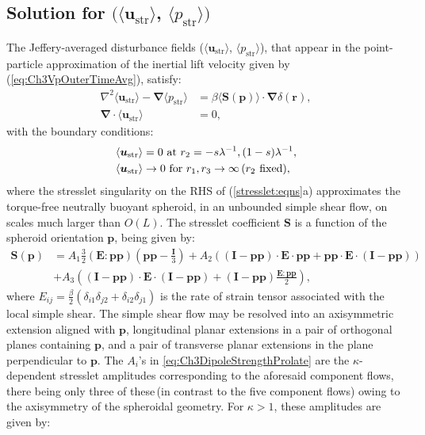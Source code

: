 \documentclass{jfm}
\begin{document}
\subsection{\texorpdfstring{Solution for $(\langle\bm{u}_\text{str}\rangle$, $\langle p_\text{str}\rangle)$}{Solution for the velocity field due to bounded Stresslet}}\label{sec:Ch3boundedstresslet}

The Jeffery-averaged disturbance fields ($\langle\bm{u}_\text{str}\rangle$, $\langle p_\text{str}\rangle$), that appear in the point-particle approximation of the inertial lift velocity given by (\ref{eq:Ch3VpOuterTimeAvg}), satisfy:
    \begin{subequations} \label{eq:Ch3StressletEqn}
    	\begin{align}
    	\nabla^2 \langle\bm{u}_\text{str}\rangle-\bm{\nabla}\langle p_\text{str}\rangle&=\beta\langle\bm{S}(\bm{p})\rangle\cdot \bm{\nabla}\delta(\bm{r}),\\
    	\bm{\nabla}\cdot\langle\bm{u}_\text{str}\rangle&=0,
    	\end{align}  \label{stresslet:eqns}
    \end{subequations}
    with the boundary conditions: 
    \begin{subequations} \label{eq:Ch3StressletBC}
    	\begin{align}
    	\langle\bm{u}_\text{str}\rangle&=0 \text{ at } r_2=-s\lambda^{-1}, (1-s)\lambda^{-1},\\    	\langle\bm{u}_\text{str}\rangle&\rightarrow 0 \text{ for } r_1,r_3\rightarrow\infty\,(r_2\hspace*{0.05in}\text{fixed}),
    	\end{align}
    \end{subequations}
where the stresslet singularity on the RHS of (\ref{stresslet:eqns}a) approximates the torque-free neutrally buoyant spheroid, in an unbounded simple shear flow, on scales much larger than $O(L)$. The stresslet coefficient $\bm{S}$ is a function of the spheroid orientation $\bm{p}$, being given by\citep{navaneeth2017}:
\begin{align}
\bm{S}(\bm{p})&= A_1 \frac{3}{2}(\bm{E}:\bm{pp})\left(\bm{pp}-\frac{\bm{I}}{3}\right) + A_2 ((\bm{I}-\bm{pp})\cdot\bm{E}\cdot\bm{pp}+\bm{pp}\cdot\bm{E}\cdot(\bm{I}-\bm{pp}))\nonumber\\& +A_3\left((\bm{I}-\bm{pp})\cdot\bm{E}\cdot(\bm{I}-\bm{pp})+(\bm{I}-\bm{pp})\frac{\bm{E}:\bm{pp}}{2}\right),
\label{eq:Ch3DipoleStrengthProlate}
\end{align}
where $E_{ij}=\frac{\beta}{2}(\delta_{i1}\delta_{j2}+\delta_{i2}\delta_{j1})$ is the rate of strain tensor associated with the local simple shear. The simple shear flow may be resolved into an axisymmetric extension aligned with $\bm{p}$, longitudinal planar extensions in a pair of orthogonal planes containing $\bm{p}$, and a pair of transverse planar extensions in the plane perpendicular to $\bm{p}$\citep{subkoch2006,navaneeth2016}. The $A_i$'s in \eqref{eq:Ch3DipoleStrengthProlate} are the $\kappa$-dependent stresslet amplitudes corresponding to the aforesaid component flows, there being only three of these\,(in contrast to the five component flows) owing to the axisymmetry of the spheroidal geometry\citep{kimkarrila,navaneeth2017}. For $\kappa>1$, these amplitudes are given by:
\end{document}
